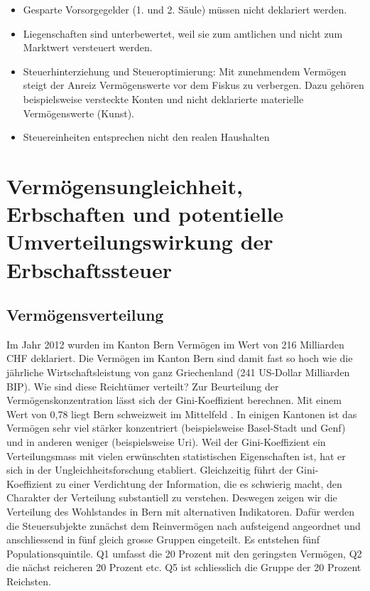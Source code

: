\documentclass[a4paper, 12pt,liststotoc]{scrartcl}
\numberwithin{equation}{section}
\begin{document}
\begin{itemize}
\item
  Gesparte Vorsorgegelder (1. und 2. Säule) müssen nicht deklariert
  werden.
\item
  Liegenschaften sind unterbewertet, weil sie zum amtlichen und nicht
  zum Marktwert versteuert werden.
\item
  Steuerhinterziehung und Steueroptimierung: Mit zunehmendem Vermögen
  steigt der Anreiz Vermögenswerte vor dem Fiskus zu verbergen. Dazu
  gehören beispielsweise versteckte Konten und nicht deklarierte
  materielle Vermögenswerte (Kunst).
\item
  Steuereinheiten entsprechen nicht den realen Haushalten
\end{itemize}

\section{Vermögensungleichheit, Erbschaften und potentielle
  Umverteilungswirkung der
  Erbschaftssteuer}\label{vermuxf6gensungleichheit-erbschaften-und-potentielle-umverteilungswirkung-der-erbschaftssteuer}
\subsection{Vermögensverteilung}\label{vermuxf6gensverteilung}

Im Jahr 2012 wurden im Kanton Bern Vermögen im Wert von 216 Milliarden
CHF deklariert. Die Vermögen im Kanton Bern sind damit fast so hoch wie
die jährliche Wirtschaftsleistung von ganz Griechenland (241 US-Dollar
Milliarden BIP). Wie sind diese Reichtümer verteilt? Zur Beurteilung der
Vermögenskonzentration lässt sich der Gini-Koeffizient berechnen. Mit
einem Wert von 0,78 liegt Bern schweizweit im Mittelfeld \parencite{jann2014}. In einigen Kantonen ist das Vermögen sehr viel stärker
konzentriert (beispielsweise Basel-Stadt und Genf) und in anderen
weniger (beispielsweise Uri). Weil der Gini-Koeffizient ein
Verteilungsmass mit vielen erwünschten statistischen Eigenschaften ist,
hat er sich in der Ungleichheitsforschung etabliert. Gleichzeitig führt
der Gini-Koeffizient zu einer Verdichtung der Information, die es
schwierig macht, den Charakter der Verteilung substantiell zu verstehen.
Deswegen zeigen wir die Verteilung des Wohlstandes in Bern mit
alternativen Indikatoren. Dafür werden die Steuersubjekte zunächst dem
Reinvermögen nach aufsteigend angeordnet und anschliessend in fünf
gleich grosse Gruppen eingeteilt. Es entstehen fünf Populationsquintile.
Q1 umfasst die 20 Prozent mit den geringsten Vermögen, Q2 die nächst
reicheren 20 Prozent etc. Q5 ist schliesslich die Gruppe der 20 Prozent
Reichsten.
\end{document}
